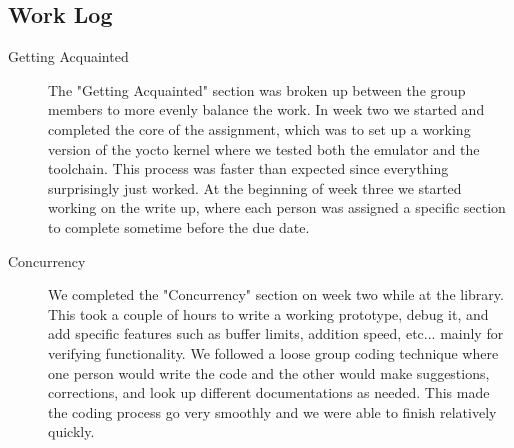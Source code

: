 \documentclass[letterpaper,10pt]{article}
\begin{document}
\subsection{Work Log}
\begin{description}
    \item[Getting Acquainted]
    The "Getting Acquainted" section was broken up between the group members to more evenly balance the work. In week two we started and completed the core of the assignment, which was to set up a working version of the yocto kernel where we tested both the emulator and the toolchain. This process was faster than expected since everything surprisingly just worked. At the beginning of week three we started working on the write up, where each person was assigned a specific section to complete sometime before the due date.
    \item[Concurrency]
    We completed the "Concurrency" section on week two while at the library. This took a couple of hours to write a working prototype, debug it, and add specific features such as buffer limits, addition speed, etc... mainly for verifying functionality. We followed a loose group coding technique where one person would write the code and the other would make suggestions, corrections, and look up different documentations as needed. This made the coding process go very smoothly and we were able to finish relatively quickly.
                \end{description}
\end{document}

